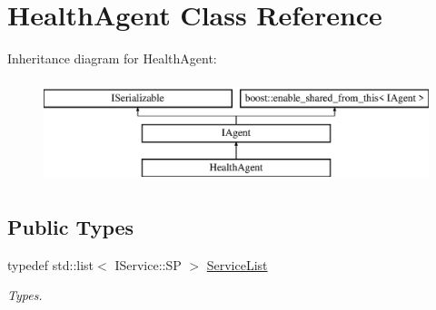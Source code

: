 \hypertarget{class_health_agent}{}\section{Health\+Agent Class Reference}
\label{class_health_agent}
Inheritance diagram for Health\+Agent\+:\begin{figure}[H]
\begin{center}
\leavevmode
\includegraphics[height=3.000000cm]{class_health_agent}
\end{center}
\end{figure}
\subsection*{Public Types}
\begin{DoxyCompactItemize}
\item 
\mbox{\label{class_health_agent_a8803414685f25e3c0985bbdcc21bb4e5}} 
typedef std\+::list$<$ I\+Service\+::\+SP $>$ \hyperlink{class_health_agent_a8803414685f25e3c0985bbdcc21bb4e5}{Service\+List}
\begin{DoxyCompactList}\small\item\em Types. \end{DoxyCompactList}\end{DoxyCompactItemize}
